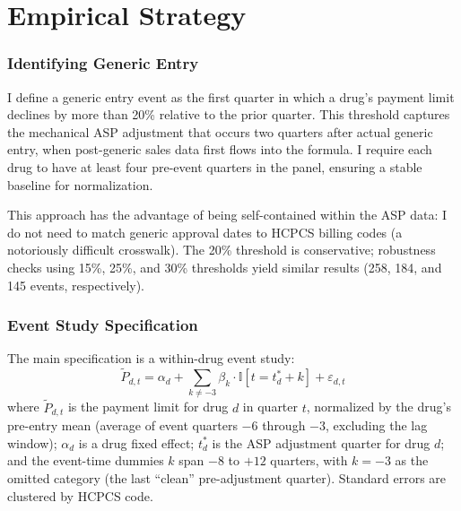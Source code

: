 \documentclass[12pt]{article}
\newcommand{\ind}{\mathbb{I}}
\begin{document}



\section{Empirical Strategy}\label{sec:methods}

\subsubsection*{Identifying Generic Entry} I define a generic entry event as the first quarter in which a drug's payment limit declines by more than 20\% relative to the prior quarter. This threshold captures the mechanical ASP adjustment that occurs two quarters after actual generic entry, when post-generic sales data first flows into the formula. I require each drug to have at least four pre-event quarters in the panel, ensuring a stable baseline for normalization.

This approach has the advantage of being self-contained within the ASP data: I do not need to match generic approval dates to HCPCS billing codes (a notoriously difficult crosswalk). The 20\% threshold is conservative; robustness checks using 15\%, 25\%, and 30\% thresholds yield similar results (258, 184, and 145 events, respectively).

\subsubsection*{Event Study Specification} The main specification is a within-drug event study:
\begin{equation}\label{eq:event_study}
\tilde{P}_{d,t} = \alpha_d + \sum_{k \neq -3} \beta_k \cdot \ind[t = t^*_d + k] + \varepsilon_{d,t}
\end{equation}
where $\tilde{P}_{d,t}$ is the payment limit for drug $d$ in quarter $t$, normalized by the drug's pre-entry mean (average of event quarters $-6$ through $-3$, excluding the lag window); $\alpha_d$ is a drug fixed effect; $t^*_d$ is the ASP adjustment quarter for drug $d$; and the event-time dummies $k$ span $-8$ to $+12$ quarters, with $k = -3$ as the omitted category (the last ``clean'' pre-adjustment quarter). Standard errors are clustered by HCPCS code.
\end{document}
